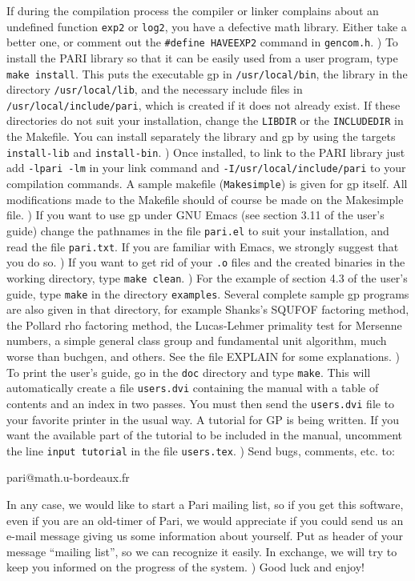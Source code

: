       If during the compilation process the compiler or linker complains
      about an undefined function {\tt exp2} or {\tt log2}, you have a 
      defective math library. Either take a better one, or comment out
      the {\tt \#define HAVEEXP2} command in {\tt gencom.h}.
) To install the PARI library so that it can be easily used from a user
   program, type {\tt make install}. This puts the executable gp in 
   {\tt /usr/local/bin}, the library in the directory {\tt /usr/local/lib}, 
   and the necessary include files in {\tt /usr/local/include/pari}, which is
   created if it does not already exist. If these directories do not suit your 
   installation, change the {\tt LIBDIR} or the {\tt INCLUDEDIR} in the
   Makefile. You can install separately the library and gp by using the targets
   {\tt install-lib} and {\tt install-bin}.
) Once installed, to link to the PARI library just add {\tt -lpari -lm} in 
   your link command and {\tt -I/usr/local/include/pari} to your compilation
   commands. A sample makefile ({\tt Makesimple}) is given for gp itself.
   All modifications made to the Makefile should of course be made on the
   Makesimple file.
) If you want to use gp under GNU Emacs (see section 3.11 of the user's
   guide) change the pathnames in the file {\tt pari.el} to suit your 
   installation, and read the file {\tt pari.txt}. If you are familiar with
   Emacs, we strongly suggest that you do so.
) If you want to get rid of your {\tt .o} files and the created binaries in 
   the working directory, type {\tt make clean}.
) For the example of section 4.3 of the user's guide, type {\tt make}
   in the directory {\tt examples}. Several complete sample gp programs are
   also given in that directory, for example Shanks's SQUFOF factoring method,
   the Pollard rho factoring method, the Lucas-Lehmer primality test for
   Mersenne numbers, a simple general class group and fundamental unit
   algorithm, much worse than buchgen, and others. See the 
   file EXPLAIN for some explanations.
) To print the user's guide, go in the {\tt doc} directory and type 
   {\tt make}. This will automatically create a file {\tt users.dvi} 
   containing the manual with a table of contents and an index in two passes. 
   You must then send the {\tt users.dvi} file to your favorite printer in 
   the usual way. A tutorial for GP is being written. If you want the 
   available part of the tutorial to be included in the manual, uncomment the
   line {\tt \bs input tutorial} in the file {\tt users.tex}.
) Send bugs, comments, etc. to:

\centerline{pari@math.u-bordeaux.fr}

   In any case, we would like to start a Pari mailing list, so if you get
   this software, even if you are an old-timer of Pari, we would appreciate
   if you could send us an e-mail message giving us some information about
   yourself. Put as header of your message ``mailing list'', so we can recognize
   it easily. In exchange, we will try to keep you informed on the progress of
   the system.
) Good luck and enjoy!


\vfill\eject

